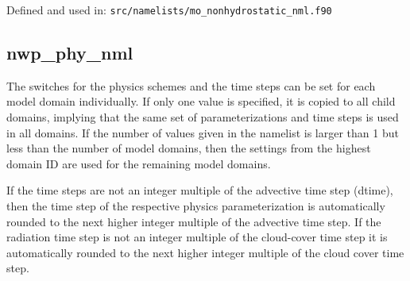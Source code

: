 Defined and used in: \verb+src/namelists/mo_nonhydrostatic_nml.f90+


\subsection{nwp\_phy\_nml}

The switches for the physics schemes and the time steps can be set for each model domain individually.
If only one value is specified, it is copied to all child domains, implying that the same set
of parameterizations and time steps is used in all domains. If the number of values given
in the namelist is larger than 1 but less than the number of model domains, then the settings
from the highest domain ID are used for the remaining model domains. 

If the time steps are not an integer multiple of the advective time step (dtime), then the time step of the
respective physics parameterization is automatically rounded to the next higher integer multiple
of the advective time step. If the radiation time step is not an integer multiple of the cloud-cover 
time step it is automatically rounded to the next higher integer multiple of the cloud cover time step.

